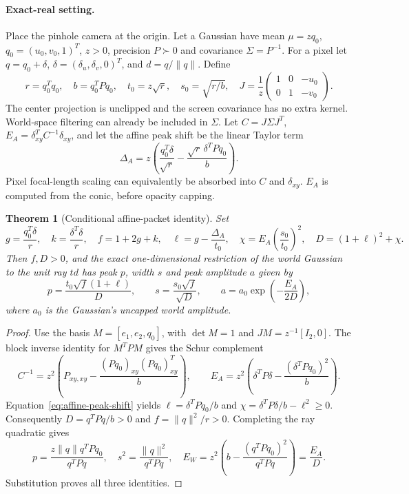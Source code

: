 \documentclass[11pt,a4paper]{article}
\newtheorem{theorem}{Theorem}
\begin{document}
\paragraph{Exact-real setting.}
Place the pinhole camera at the origin. Let a Gaussian have mean
$\mu=zq_0$, $q_0=(u_0,v_0,1)^T$, $z>0$, precision $P\succ0$
and covariance $\Sigma=P^{-1}$. For a pixel let
$q=q_0+\delta$, $\delta=(\delta_u,\delta_v,0)^T$, and
$d=q/\|q\|$. Define
\[
 r=q_0^Tq_0,\quad b=q_0^TPq_0,\quad
 t_0=z\sqrt r,\quad s_0=\sqrt{r/b},\quad
 J=\frac1z\begin{pmatrix}1&0&-u_0\\0&1&-v_0\end{pmatrix}.
\]
The center projection is unclipped and the screen covariance has no
extra kernel. World-space filtering can already be included in $\Sigma$.
Let $C=J\Sigma J^T$, $E_A=\delta_{xy}^TC^{-1}\delta_{xy}$, and
let the affine peak shift be the linear Taylor term
\begin{equation}\label{eq:affine-peak-shift}
 \Delta_A=z\left(\frac{q_0^T\delta}{\sqrt r}
       -\frac{\sqrt r\,\delta^TPq_0}{b}\right).
\end{equation}
Pixel focal-length scaling can equivalently be absorbed into $C$ and
$\delta_{xy}$. $E_A$ is computed from the conic, before opacity capping.

\begin{theorem}[Conditional affine-packet identity]\label{thm:packet}
Set
\[
 g=\frac{q_0^T\delta}{r},\quad k=\frac{\delta^T\delta}{r},\quad
 f=1+2g+k,\quad \ell=g-\frac{\Delta_A}{t_0},\quad
 \chi=E_A\left(\frac{s_0}{t_0}\right)^2,\quad
 D=(1+\ell)^2+\chi.
\]
Then $f,D>0$, and the exact one-dimensional restriction of the world
Gaussian to the unit ray $td$ has peak $p$, width $s$ and peak
amplitude $a$ given by
\begin{equation}\label{eq:packet-exact}
 p=\frac{t_0\sqrt f(1+\ell)}{D},\qquad
 s=\frac{s_0\sqrt f}{\sqrt D},\qquad
 a=a_0\exp\!\left(-\frac{E_A}{2D}\right),
\end{equation}
where $a_0$ is the Gaussian's uncapped world amplitude.
\end{theorem}
\begin{proof}
Use the basis $M=[e_1,e_2,q_0]$, with $\det M=1$ and
$JM=z^{-1}[I_2,0]$. The block inverse identity for $M^TPM$
gives the Schur complement
\[
 C^{-1}=z^2\left(P_{xy,xy}
       -\frac{(Pq_0)_{xy}(Pq_0)_{xy}^T}{b}\right),\qquad
 E_A=z^2\left(\delta^TP\delta
       -\frac{(\delta^TPq_0)^2}{b}\right).
\]
Equation~\eqref{eq:affine-peak-shift} yields
$\ell=\delta^TPq_0/b$ and
$\chi=\delta^TP\delta/b-\ell^2\ge0$.
Consequently $D=q^TPq/b>0$ and $f=\|q\|^2/r>0$.
Completing the ray quadratic gives
\[
 p=\frac{z\|q\|q^TPq_0}{q^TPq},\quad
 s^2=\frac{\|q\|^2}{q^TPq},\quad
 E_W=z^2\left(b-\frac{(q^TPq_0)^2}{q^TPq}\right)=\frac{E_A}{D}.
\]
Substitution proves all three identities.
\end{proof}
\end{document}
